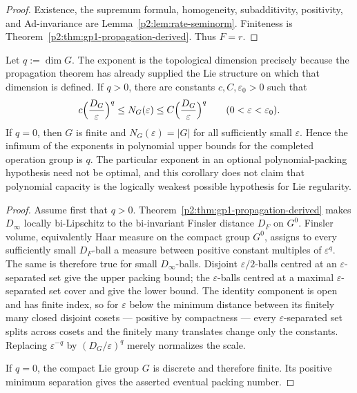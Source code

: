\documentclass[11pt,a4paper]{article}
\begin{document}
\begin{proof}
Existence, the supremum formula, homogeneity, subadditivity, positivity, and
Ad-invariance are Lemma~\ref{p2:lem:rate-seminorm}.  Finiteness is
Theorem~\ref{p2:thm:gp1-propagation-derived}.  Thus \(F=r\).
\end{proof}

\begin{corollary}
\label{p2:cor:gp1-capacity-saturation}
Let \(q:=\dim G\).  The exponent is the topological dimension precisely
because the propagation theorem has already supplied the Lie structure on
which that dimension is defined.  If \(q>0\), there are constants
\(c,C,\varepsilon_0>0\) such that
\[
 c\Bigl(\frac{D_G}{\varepsilon}\Bigr)^q
 \le N_G(\varepsilon)
 \le C\Bigl(\frac{D_G}{\varepsilon}\Bigr)^q
 \qquad(0<\varepsilon<\varepsilon_0).
\]
If \(q=0\), then \(G\) is finite and \(N_G(\varepsilon)=|G|\) for all
sufficiently small \(\varepsilon\).  Hence the infimum of the exponents in
polynomial upper bounds for the completed operation group is \(q\).  The
particular exponent in an optional polynomial-packing hypothesis need not be optimal, and this
corollary does not claim that polynomial capacity is the logically weakest
possible hypothesis for Lie regularity.
\end{corollary}

\begin{proof}
Assume first that \(q>0\).  Theorem~\ref{p2:thm:gp1-propagation-derived}
makes \(D_\infty\) locally bi-Lipschitz to the bi-invariant Finsler distance
\(D_F\) on \(G^0\).  Finsler volume, equivalently Haar measure on the compact
group \(G^0\), assigns to every sufficiently small \(D_F\)-ball a measure
between positive constant multiples of \(\varepsilon^q\).  The same is
therefore true for small \(D_\infty\)-balls.  Disjoint
\(\varepsilon/2\)-balls centred at an \(\varepsilon\)-separated set give the
upper packing bound; the \(\varepsilon\)-balls centred at a maximal
\(\varepsilon\)-separated set cover and give the lower bound.  The identity
component is open and has finite index, so for \(\varepsilon\) below the
minimum distance between its finitely many closed disjoint cosets --- positive
by compactness --- every \(\varepsilon\)-separated set splits across cosets and
the finitely many translates change only the constants.  Replacing \(\varepsilon^{-q}\) by
\((D_G/\varepsilon)^q\) merely normalizes the scale.

If \(q=0\), the compact Lie group \(G\) is discrete and therefore finite.
Its positive minimum separation gives the asserted eventual packing number.
\end{proof}
\end{document}
